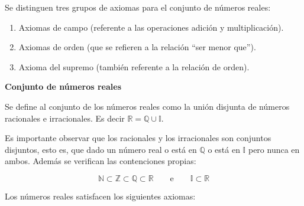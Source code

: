 	Se distinguen tres grupos de axiomas para el conjunto de números reales:
	
\begin{enumerate}
	\item Axiomas de campo (referente a las operaciones adición y multiplicación).
	\item Axiomas de orden (que se refieren a la relación “ser menor que”).
	\item Axioma del supremo (también referente a la relación de orden).
\end{enumerate}	
	
\vspace{0.21cm}
\begin{tcolorbox}
	\begin{defi}\textbf{Conjunto de números reales}\end{defi}
	Se define al conjunto de los números reales como la unión disjunta de números racionales e irracionales. Es decir $\mathbb{R} = \mathbb{Q} \cup \mathbb{I}$.
	
Es importante observar que los racionales y los irracionales son conjuntos disjuntos, esto es, que dado un número real o está en $\mathbb{Q}$ o está en $\mathbb{I}$ pero nunca en ambos. Además se verifican las contenciones propias:

		  \[ \mathbb{N} \subset \mathbb{Z} \subset \mathbb{Q} \subset \mathbb{R} \qquad  \mbox{e} \qquad \mathbb{I} \subset \mathbb{R}  \]
\end{tcolorbox}

Los números reales satisfacen los siguientes axiomas:

